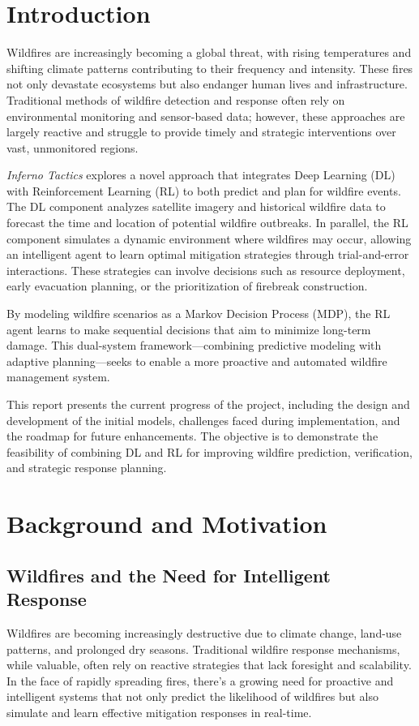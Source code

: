 \documentclass[conference]{IEEEtran}
\begin{document}
\section{Introduction}

Wildfires are increasingly becoming a global threat, with rising temperatures and shifting climate patterns contributing to their frequency and intensity. These fires not only devastate ecosystems but also endanger human lives and infrastructure. Traditional methods of wildfire detection and response often rely on environmental monitoring and sensor-based data; however, these approaches are largely reactive and struggle to provide timely and strategic interventions over vast, unmonitored regions.

\noindent
\textit{Inferno Tactics} explores a novel approach that integrates Deep Learning (DL) with Reinforcement Learning (RL) to both predict and plan for wildfire events. The DL component analyzes satellite imagery and historical wildfire data to forecast the time and location of potential wildfire outbreaks. In parallel, the RL component simulates a dynamic environment where wildfires may occur, allowing an intelligent agent to learn optimal mitigation strategies through trial-and-error interactions. These strategies can involve decisions such as resource deployment, early evacuation planning, or the prioritization of firebreak construction.

\noindent
By modeling wildfire scenarios as a Markov Decision Process (MDP), the RL agent learns to make sequential decisions that aim to minimize long-term damage. This dual-system framework—combining predictive modeling with adaptive planning—seeks to enable a more proactive and automated wildfire management system.

\noindent
This report presents the current progress of the project, including the design and development of the initial models, challenges faced during implementation, and the roadmap for future enhancements. The objective is to demonstrate the feasibility of combining DL and RL for improving wildfire prediction, verification, and strategic response planning.

\section{Background and Motivation}

\subsection{Wildfires and the Need for Intelligent Response}
Wildfires are becoming increasingly destructive due to climate change, land-use patterns, and prolonged dry seasons. Traditional wildfire response mechanisms, while valuable, often rely on reactive strategies that lack foresight and scalability. In the face of rapidly spreading fires, there's a growing need for proactive and intelligent systems that not only predict the likelihood of wildfires but also simulate and learn effective mitigation responses in real-time.
\end{document}
